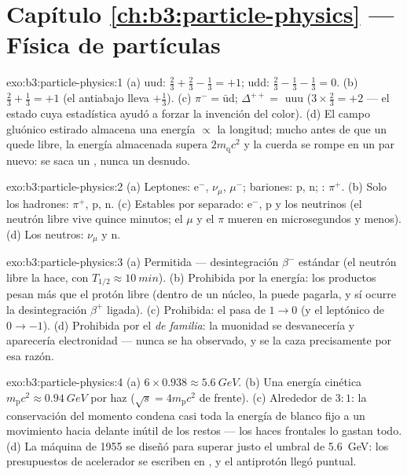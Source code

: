 \section*{Capítulo \ref{ch:b3:particle-physics} --- Física de partículas}

\begin{solution}{exo:b3:particle-physics:1}
(a) uud: $\tfrac23 + \tfrac23 - \tfrac13 = +1$; udd: $\tfrac23 -
\tfrac13 - \tfrac13 = 0$. (b) $\tfrac23 + \tfrac13 = +1$ (el
antiabajo lleva $+\tfrac13$). (c) $\pi^- =
\bar{\text{u}}\text{d}$; $\Delta^{++} = $ uuu ($3\times\tfrac23 =
+2$ --- el estado cuya estadística ayudó a forzar la invención del
color). (d) El campo gluónico estirado almacena una energía
$\propto$ la longitud; mucho antes de que un  quede libre, la energía almacenada
supera $2m_{\text{q}}c^2$ y la cuerda se rompe en un par
nuevo: se saca un , nunca un  desnudo.
\end{solution}

\begin{solution}{exo:b3:particle-physics:2}
(a) Leptones: e$^-$, $\nu_\mu$, $\mu^-$; bariones: p, n; :
$\pi^+$. (b) Solo los hadrones: $\pi^+$, p, n. (c) Estables por separado:
e$^-$, p y los neutrinos (el neutrón libre vive quince
minutos; el $\mu$ y el $\pi$ mueren en microsegundos y menos). (d) Los
neutros: $\nu_\mu$ y n.
\end{solution}

\begin{solution}{exo:b3:particle-physics:3}
(a) Permitida --- desintegración $\beta^-$ estándar (el neutrón libre la
hace, con $T_{1/2} \approx \qty{10}{min}$). (b) Prohibida por la energía:
los productos pesan más que el protón libre (dentro de un núcleo, la  puede pagarla, y sí ocurre la desintegración $\beta^+$ ligada). (c)
Prohibida: el  pasa de $1 \to 0$ (y el leptónico de
$0 \to -1$). (d) Prohibida por el  \emph{de familia}:
la muonidad se desvanecería y aparecería electronidad --- nunca
se ha observado, y se la caza precisamente por esa razón.
\end{solution}

\begin{solution}{exo:b3:particle-physics:4}
(a) $6\times0.938 \approx \qty{5.6}{GeV}$. (b) Una energía cinética
$m_{\text{p}}c^2 \approx \qty{0.94}{GeV}$ por haz
($\sqrt s = 4m_{\text{p}}c^2$ de frente). (c) Alrededor de $3:1$: la
conservación del momento condena casi toda la energía de blanco fijo a un
movimiento hacia delante inútil de los restos --- los haces frontales lo gastan
todo. (d) La máquina de 1955 se diseñó para superar justo el
umbral de \qty{5.6}{GeV}: los presupuestos de acelerador se escriben en
, y el antiprotón llegó puntual.
\end{solution}

